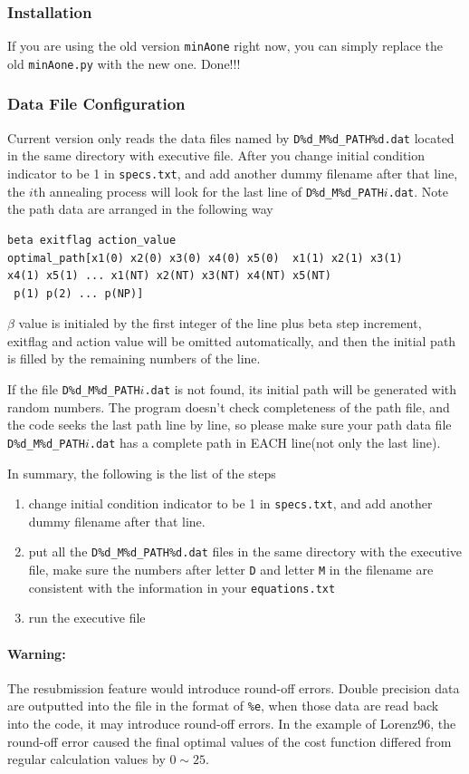 \documentclass[11pt]{article}
\begin{document}
{\subsubsection{Installation}
If you are using the old version \texttt{minAone} right now, you can simply replace the old \texttt{minAone.py} with the new one. Done!!!
\subsubsection{Data File Configuration}
Current version only reads the data files named by \texttt{D\%d\_M\%d\_PATH\%d.dat} located in the same directory with executive file. After you change initial condition indicator to be 1 in \texttt{specs.txt}, and add another dummy filename after that line, the $i$th annealing process will look for the last line of \texttt{D\%d\_M\%d\_PATH}$i$\texttt{.dat}. Note the path data are arranged in the following way
\begin{verbatim}
beta exitflag action_value 
optimal_path[x1(0) x2(0) x3(0) x4(0) x5(0)  x1(1) x2(1) x3(1) 
x4(1) x5(1) ... x1(NT) x2(NT) x3(NT) x4(NT) x5(NT)
 p(1) p(2) ... p(NP)]
\end{verbatim}
$\beta$ value is initialed by the first integer of the line plus beta step increment, exitflag and action value will be omitted automatically, and then the initial path is filled by the remaining numbers of the line.

If the file \texttt{D\%d\_M\%d\_PATH}$i$\texttt{.dat} is not found, its initial path will be generated with random numbers. The program doesn't check completeness of the path file, and the code seeks the last path line by line, so please make sure your path data file \texttt{D\%d\_M\%d\_PATH}$i$\texttt{.dat} has a complete path in EACH line(not only the last line).

In summary, the following is the list of the steps
\begin{enumerate}
\item change initial condition indicator to be 1 in \texttt{specs.txt}, and add another {\color{red}dummy} filename after that line. 
\item put all the \texttt{D\%d\_M\%d\_PATH\%d.dat} files in the same directory with the executive file, make sure the numbers after letter \texttt{D} and letter \texttt{M} in the filename are consistent with the information in your \texttt{equations.txt}
\item run the executive file
\end{enumerate}
\paragraph{Warning:} The resubmission feature would introduce round-off errors. Double precision data are outputted into the file in the format of \texttt{\%e}, when those data are read back into the code, it may introduce round-off errors. In the example of Lorenz96, the round-off error caused the final optimal values of the cost function differed from regular calculation values by $0\sim25$.
\fi

}
\end{document}
